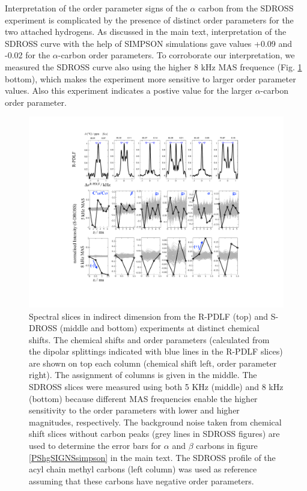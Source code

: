 \documentclass[journal=jpcbfk]{achemso}
\begin{document}
Interpretation of the order parameter signs of the $\alpha$ carbon from the SDROSS experiment
is complicated by the presence of distinct order parameters for the two attached hydrogens.
As discussed in the main text, interpretation of the SDROSS curve with the help of SIMPSON
simulations gave values +0.09 and -0.02 for the $\alpha$-carbon order parameters.
To corroborate our interpretation, we measured the SDROSS curve also using the higher 8 kHz
MAS frequence (Fig. \ref{DPslices} bottom), which makes the experiment more sensitive to larger order parameter values.
Also this experiment indicates a postive value for the larger $\alpha$-carbon order parameter.
\begin{figure}[]
  \includegraphics[width=\textwidth]{../Figs/SI_man.pdf}
  \caption{\label{DPslices}
    Spectral slices in indirect dimension from the R-PDLF (top) and S-DROSS (middle and bottom) experiments at distinct chemical shifts.
    The chemical shifts and order parameters (calculated from the dipolar splittings indicated with blue lines in the R-PDLF slices)
    are shown on top each column (chemical shift left, order parameter right).
    The assignment of columns is given in the middle.  
    The SDROSS slices were measured using both 5 KHz (middle) and 8 kHz (bottom) because different MAS frequencies enable the
    higher sensitivity to the order parameters with lower and higher magnitudes, respectively.
    The background noise taken from chemical shift slices without carbon peaks (grey lines in SDROSS figures)
    are used to determine the error bars for $\alpha$ and $\beta$ carbons in figure \ref{PShgSIGNSsimpson} in the main text.
    The SDROSS profile of the acyl chain methyl carbons (left column) was used as reference assuming that these carbons have negative order parameters.  
  }
\end{figure}
\end{document}
